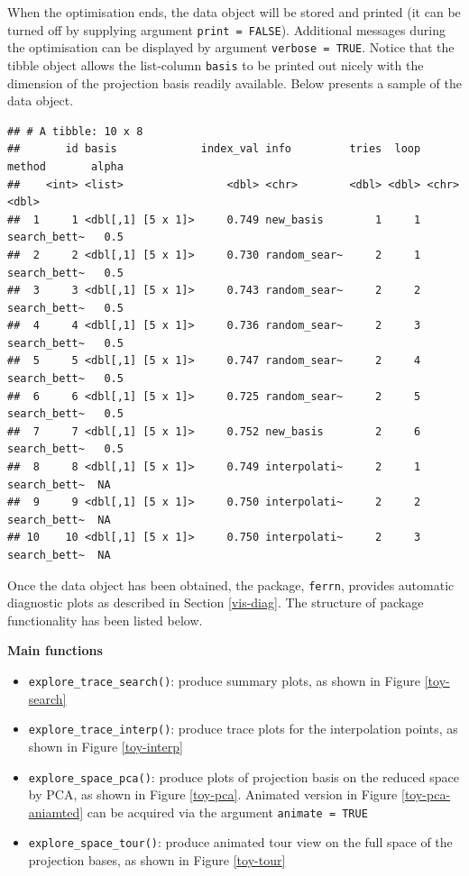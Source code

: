 \documentclass[12pt]{article}
\providecommand{\tightlist}{%
  \setlength{\itemsep}{0pt}\setlength{\parskip}{0pt}}
\begin{document}
When the optimisation ends, the data object will be stored and printed (it can be turned off by supplying argument \texttt{print\ =\ FALSE}). Additional messages during the optimisation can be displayed by argument \texttt{verbose\ =\ TRUE}. Notice that the tibble object allows the list-column \texttt{basis} to be printed out nicely with the dimension of the projection basis readily available. Below presents a sample of the data object.

\begin{verbatim}
## # A tibble: 10 x 8
##       id basis             index_val info         tries  loop method       alpha
##    <int> <list>                <dbl> <chr>        <dbl> <dbl> <chr>        <dbl>
##  1     1 <dbl[,1] [5 x 1]>     0.749 new_basis        1     1 search_bett~   0.5
##  2     2 <dbl[,1] [5 x 1]>     0.730 random_sear~     2     1 search_bett~   0.5
##  3     3 <dbl[,1] [5 x 1]>     0.743 random_sear~     2     2 search_bett~   0.5
##  4     4 <dbl[,1] [5 x 1]>     0.736 random_sear~     2     3 search_bett~   0.5
##  5     5 <dbl[,1] [5 x 1]>     0.747 random_sear~     2     4 search_bett~   0.5
##  6     6 <dbl[,1] [5 x 1]>     0.725 random_sear~     2     5 search_bett~   0.5
##  7     7 <dbl[,1] [5 x 1]>     0.752 new_basis        2     6 search_bett~   0.5
##  8     8 <dbl[,1] [5 x 1]>     0.749 interpolati~     2     1 search_bett~  NA  
##  9     9 <dbl[,1] [5 x 1]>     0.750 interpolati~     2     2 search_bett~  NA  
## 10    10 <dbl[,1] [5 x 1]>     0.750 interpolati~     2     3 search_bett~  NA
\end{verbatim}

Once the data object has been obtained, the package, \texttt{ferrn}, provides automatic diagnostic plots as described in Section \ref{vis-diag}. The structure of package functionality has been listed below.

\textbf{Main functions}

\begin{itemize}
\tightlist
\item
  \texttt{explore\_trace\_search()}: produce summary plots, as shown in Figure \ref{toy-search}
\item
  \texttt{explore\_trace\_interp()}: produce trace plots for the interpolation points, as shown in Figure \ref{toy-interp}
\item
  \texttt{explore\_space\_pca()}: produce plots of projection basis on the reduced space by PCA, as shown in Figure \ref{toy-pca}. Animated version in Figure \ref{toy-pca-aniamted} can be acquired via the argument \texttt{animate\ =\ TRUE}
\item
  \texttt{explore\_space\_tour()}: produce animated tour view on the full space of the projection bases, as shown in Figure \ref{toy-tour}
\end{itemize}
\end{document}
